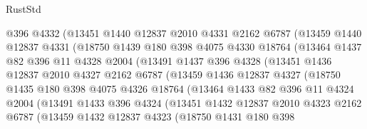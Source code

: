 \begin{lexlean}{RustStd}
\begin{coremodule}
{\begin{coremodule}
{{{{{{{{{{{{{{{{{{{{{{{{{{{{{{{                @396
                @4332
                (@13451
                  @1440
                  @12837
                  @2010
                  @4331
                  @2162
                  @6787
                  (@13459
                    @1440
                    @12837
                    @4331
                    (@18750
                      @1439
                      @180
                      @398
                      @4075
                      @4330
                      @18764
                      (@13464
                        @1437
                        @82
                        @396
                        @11
                        @4328
                        @2004
                        (@13491
                          @1437
                          @396
                          @4328
                          (@13451
                            @1436
                            @12837
                            @2010
                            @4327
                            @2162
                            @6787
                            (@13459
                              @1436
                              @12837
                              @4327
                              (@18750
                                @1435
                                @180
                                @398
                                @4075
                                @4326
                                @18764
                                (@13464
                                  @1433
                                  @82
                                  @396
                                  @11
                                  @4324
                                  @2004
                                  (@13491
                                    @1433
                                    @396
                                    @4324
                                    (@13451
                                      @1432
                                      @12837
                                      @2010
                                      @4323
                                      @2162
                                      @6787
                                      (@13459
                                        @1432
                                        @12837
                                        @4323
                                        (@18750
                                          @1431
                                          @180
                                          @398
}}}}}}}}}}}}}}}}}}}}}}}}}}}}}}}
\end{coremodule}}
\end{coremodule}
\end{lexlean}
